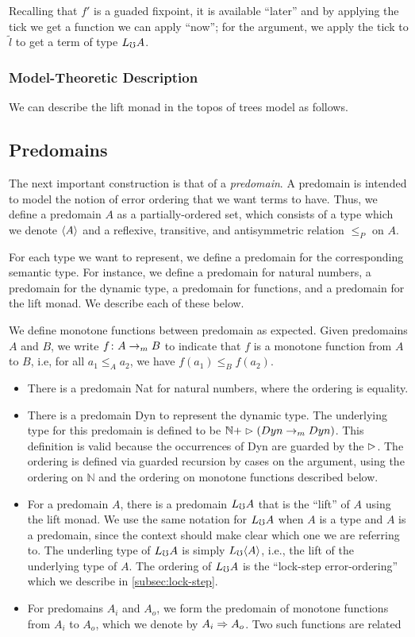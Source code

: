 \documentclass[acmsmall,screen]{acmart}
\begin{document}
Recalling that $f'$ is a guaded fixpoint, it is available ``later'' and by
applying the tick we get a function we can apply ``now''; for the argument,
we apply the tick to $\tilde{l}$ to get a term of type $L_\mho A$.


\subsubsection{Model-Theoretic Description}
We can describe the lift monad in the topos of trees model as follows.


\subsection{Predomains}

The next important construction is that of a \emph{predomain}. A predomain is intended to
model the notion of error ordering that we want terms to have. Thus, we define a predomain $A$
as a partially-ordered set, which consists of a type which we denote $\langle {A} \rangle$ and a reflexive,
transitive, and antisymmetric relation $\le_P$ on $A$.

For each type we want to represent, we define a predomain for the corresponding semantic
type. For instance, we define a predomain for natural numbers, a predomain for the
dynamic type, a predomain for functions, and a predomain for the lift monad. We
describe each of these below.

We define monotone functions between predomain as expected. Given predomains
$A$ and $B$, we write $f \colon A \to_m B$ to indicate that $f$ is a monotone
function from $A$ to $B$, i.e, for all $a_1 \le_A a_2$, we have $f(a_1) \le_B f(a_2)$.

\begin{itemize}
  \item There is a predomain Nat for natural numbers, where the ordering is equality.
  
  \item There is a predomain Dyn to represent the dynamic type. The underlying type
  for this predomain is defined to be $\mathbb{N} + \vartriangleright (Dyn \to_m Dyn)$.
  This definition is valid because the occurrences of Dyn are guarded by the $\vartriangleright$.
  The ordering is defined via guarded recursion by cases on the argument, using the
  ordering on $\mathbb{N}$ and the ordering on monotone functions described below.

  \item For a predomain $A$, there is a predomain $L_\mho A$ that is the ``lift'' of $A$
  using the lift monad. We use the same notation for $L_\mho A$ when $A$ is a type
  and $A$ is a predomain, since the context should make clear which one we are referring to.
  The underling type of $L_\mho A$ is simply $L_\mho \langle {A} \rangle$, i.e., the lift of the underlying
  type of $A$.
  The ordering of $L_\mho A$ is the ``lock-step error-ordering'' which we describe in \ref{subsec:lock-step}.

  \item For predomains $A_i$ and $A_o$, we form the predomain of monotone functions
  from $A_i$ to $A_o$, which we denote by $A_i \Rightarrow A_o$.
  Two such functions are related
\end{itemize}
\end{document}
